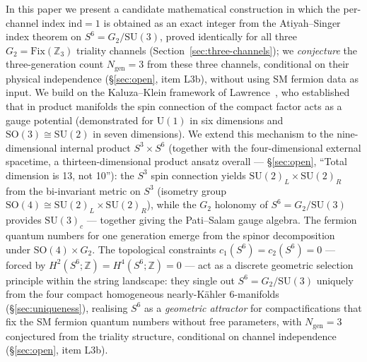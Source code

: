 \documentclass[12pt,a4paper]{article}
\newcommand{\ind}{\mathrm{ind}}
\newcommand{\ZZ}{\mathbb{Z}}
\begin{document}
In this paper we present a candidate mathematical construction in which the
per-channel index $\ind=1$ is obtained as an exact integer from the
Atiyah--Singer index theorem on $S^6 = G_2/\mathrm{SU}(3)$, proved identically for
all three $G_2=\mathrm{Fix}(\mathbb{Z}_3)$ triality channels
(Section~\ref{sec:three-channels}); we \emph{conjecture} the three-generation count
$N_{\mathrm{gen}}=3$ from these three channels, conditional on their physical
independence (\S\ref{sec:open}, item L3b), without using SM fermion data as input.
We build on the Kaluza--Klein framework of Lawrence~\cite{Lawrence2022}, who established
that in product manifolds the spin connection of the compact factor acts as a gauge
potential (demonstrated for $\mathrm{U}(1)$ in six dimensions and $\mathrm{SO}(3)\cong
\mathrm{SU}(2)$ in seven dimensions). We extend this mechanism to the nine-dimensional
internal
product $S^3\times S^6$ (together with the four-dimensional external spacetime, a
thirteen-dimensional product ansatz overall --- \S\ref{sec:open}, ``Total dimension is
13, not 10''): the $S^3$ spin connection yields $\mathrm{SU}(2)_L\times
\mathrm{SU}(2)_R$ from the bi-invariant metric on $S^3$ (isometry group $\mathrm{SO}(4)
\cong \mathrm{SU}(2)_L\times\mathrm{SU}(2)_R$), while the $G_2$ holonomy of
$S^6=G_2/\mathrm{SU}(3)$ provides $\mathrm{SU}(3)_c$ --- together giving the Pati--Salam
gauge algebra. The fermion quantum numbers for one generation emerge from the spinor
decomposition under $\mathrm{SO}(4)\times G_2$.
The topological constraints $c_1(S^6) = c_2(S^6) = 0$ --- forced by
$H^2(S^6;\ZZ) = H^4(S^6;\ZZ) = 0$ --- act as a discrete geometric selection
principle within the string landscape: they single out $S^6 = G_2/\mathrm{SU}(3)$
uniquely from the four compact homogeneous nearly-K\"{a}hler 6-manifolds
(\S\ref{sec:uniqueness}), realising $S^6$ as a \emph{geometric attractor} for
compactifications that fix the SM fermion quantum numbers without free
parameters, with $N_{\mathrm{gen}} = 3$ conjectured from the triality structure,
conditional on channel independence (\S\ref{sec:open}, item L3b).
\end{document}
